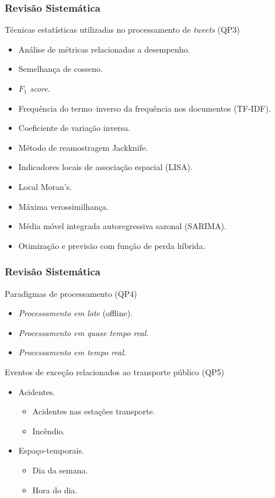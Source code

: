 \documentclass{beamer}
\begin{document}
\begin{frame}
\frametitle{Revisão Sistemática}
\begin{block}{Técnicas estatísticas utilizadas no processamento de \textit{tweets} (QP3)}
\begin{itemize}
\item \alert{Análise de métricas relacionadas a desempenho}.
\item Semelhança de cosseno.
\item \alert{\textit{${F_1}$ score}}.
\item \alert{Frequência do termo–inverso da frequência nos documentos (TF-IDF)}.
\item Coeficiente de variação inversa.
\item Método de reamostragem Jackknife.
\item Indicadores locais de associação espacial (LISA).
\item Local Moran's.
\item Máxima verossimilhança.
\item Média móvel integrada autoregressiva sazonal (SARIMA).
\item Otimização e previsão com função de perda híbrida.
\end{itemize}
\end{block}
\end{frame}
\begin{frame}
\frametitle{Revisão Sistemática}
\begin{block}{Paradigmas de processamento (QP4)}
\begin{itemize}
\item \textit{Processamento em lote} (offline).
\item \textit{Processamento em quase tempo real}.
\item \textit{Processamento em tempo real}.
\end{itemize}
\end{block}

\begin{block}{Eventos de exceção relacionados ao transporte público (QP5)}
\begin{itemize}
\item \alert{Acidentes}.
\begin{itemize}
\item Acidentes nas estações transporte.
\item Incêndio.
\end{itemize}

\item \alert{Espaço-temporais}.
\begin{itemize}
\item Dia da semana.
\item Hora do dia.
\end{itemize}

\end{itemize}
\end{block}

\end{frame}
\end{document}

